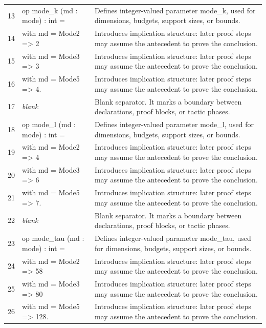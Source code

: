 \documentclass[10pt]{article}
\begin{document}
\begin{longtable}{r L{0.53\textwidth} L{0.37\textwidth}}
13 & {\ttfamily\scriptsize op mode\_k (md : mode) : int =} & Defines integer-valued parameter mode\_k, used for dimensions, budgets, support sizes, or bounds. \\
14 & {\ttfamily\scriptsize   with md = Mode2 => 2} & Introduces implication structure: later proof steps may assume the antecedent to prove the conclusion. \\
15 & {\ttfamily\scriptsize   with md = Mode3 => 3} & Introduces implication structure: later proof steps may assume the antecedent to prove the conclusion. \\
16 & {\ttfamily\scriptsize   with md = Mode5 => 4.} & Introduces implication structure: later proof steps may assume the antecedent to prove the conclusion. \\
17 & {\ttfamily\scriptsize \emph{blank}} & Blank separator.  It marks a boundary between declarations, proof blocks, or tactic phases. \\
18 & {\ttfamily\scriptsize op mode\_l (md : mode) : int =} & Defines integer-valued parameter mode\_l, used for dimensions, budgets, support sizes, or bounds. \\
19 & {\ttfamily\scriptsize   with md = Mode2 => 4} & Introduces implication structure: later proof steps may assume the antecedent to prove the conclusion. \\
20 & {\ttfamily\scriptsize   with md = Mode3 => 6} & Introduces implication structure: later proof steps may assume the antecedent to prove the conclusion. \\
21 & {\ttfamily\scriptsize   with md = Mode5 => 7.} & Introduces implication structure: later proof steps may assume the antecedent to prove the conclusion. \\
22 & {\ttfamily\scriptsize \emph{blank}} & Blank separator.  It marks a boundary between declarations, proof blocks, or tactic phases. \\
23 & {\ttfamily\scriptsize op mode\_tau (md : mode) : int =} & Defines integer-valued parameter mode\_tau, used for dimensions, budgets, support sizes, or bounds. \\
24 & {\ttfamily\scriptsize   with md = Mode2 => 58} & Introduces implication structure: later proof steps may assume the antecedent to prove the conclusion. \\
25 & {\ttfamily\scriptsize   with md = Mode3 => 80} & Introduces implication structure: later proof steps may assume the antecedent to prove the conclusion. \\
26 & {\ttfamily\scriptsize   with md = Mode5 => 128.} & Introduces implication structure: later proof steps may assume the antecedent to prove the conclusion. \\

\end{longtable}
\end{document}
